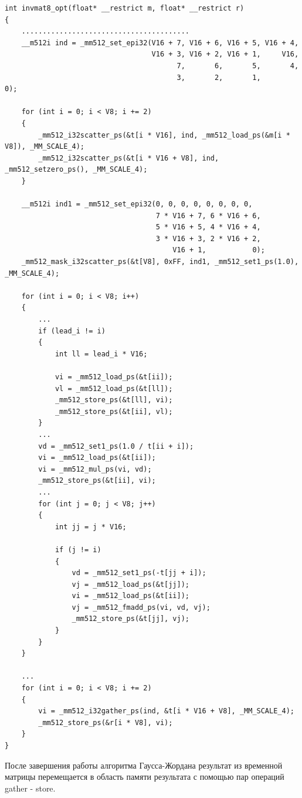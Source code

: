 \begin{lstlisting}[caption={caption},label={label}]
int invmat8_opt(float* __restrict m, float* __restrict r)
{
    ........................................
    __m512i ind = _mm512_set_epi32(V16 + 7, V16 + 6, V16 + 5, V16 + 4,
                                   V16 + 3, V16 + 2, V16 + 1,     V16,
                                         7,       6,       5,       4,
                                         3,       2,       1,       0);

    for (int i = 0; i < V8; i += 2)
    {
        _mm512_i32scatter_ps(&t[i * V16], ind, _mm512_load_ps(&m[i * V8]), _MM_SCALE_4);
        _mm512_i32scatter_ps(&t[i * V16 + V8], ind, _mm512_setzero_ps(), _MM_SCALE_4);
    }

    __m512i ind1 = _mm512_set_epi32(0, 0, 0, 0, 0, 0, 0, 0,
                                    7 * V16 + 7, 6 * V16 + 6,
                                    5 * V16 + 5, 4 * V16 + 4,
                                    3 * V16 + 3, 2 * V16 + 2,
                                        V16 + 1,           0);
    _mm512_mask_i32scatter_ps(&t[V8], 0xFF, ind1, _mm512_set1_ps(1.0), _MM_SCALE_4);

    for (int i = 0; i < V8; i++)
    {
        ...
        if (lead_i != i)
        {
            int ll = lead_i * V16;

            vi = _mm512_load_ps(&t[ii]);
            vl = _mm512_load_ps(&t[ll]);
            _mm512_store_ps(&t[ll], vi);
            _mm512_store_ps(&t[ii], vl);
        }
        ...
        vd = _mm512_set1_ps(1.0 / t[ii + i]);
        vi = _mm512_load_ps(&t[ii]);
        vi = _mm512_mul_ps(vi, vd);
        _mm512_store_ps(&t[ii], vi);
        ...
        for (int j = 0; j < V8; j++)
        {
            int jj = j * V16;

            if (j != i)
            {
                vd = _mm512_set1_ps(-t[jj + i]);
                vj = _mm512_load_ps(&t[jj]);
                vi = _mm512_load_ps(&t[ii]);
                vj = _mm512_fmadd_ps(vi, vd, vj);
                _mm512_store_ps(&t[jj], vj);
            }
        }
    }

    ...
    for (int i = 0; i < V8; i += 2)
    {
        vi = _mm512_i32gather_ps(ind, &t[i * V16 + V8], _MM_SCALE_4);
        _mm512_store_ps(&r[i * V8], vi);
    }
}
\end{lstlisting}

После завершения работы алгоритма Гаусса-Жордана результат из временной матрицы перемещается в область памяти результата с помощью пар операций gather - store.

